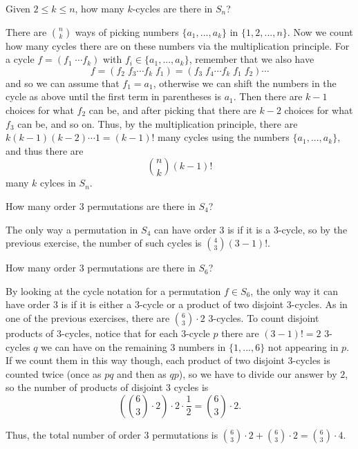 \documentclass[11pt,dvipsnames]{book}
\numberwithin{equation}{section} %
\numberwithin{figure}{section} %
\numberwithin{table}{section} %
\begin{document}
\begin{exercise}
Given $2\leq k\leq n$, how many $k$-cycles are there in $S_{n}$?

\begin{solution}
There are ${n \choose k}$ ways of picking numbers $\{a_{1},...,a_{k}\}$ in $\{1,2,...,n\}$. Now we count how many cycles there are on these numbers via the multiplication principle. For a cycle $f=(f_{1} \; \cdots  f_{k})$ with $f_{i}\in  \{a_{1},...,a_{k}\}$, remember that we also have 
\[
f=(f_{2} \; f_{3}\cdots f_{k} \; f_{1}) 
=(f_{3} \; f_{4} \cdots f_{k} \; f_{1} \; f_{2})\cdots
\]
and so we can assume that $f_{1} = a_{1}$, otherwise we can shift the numbers in the cycle as above until the first term in parentheses is $a_{1}$. Then there are $k-1$ choices for what $f_{2}$ can be, and after picking that there are $k-2$ choices for what $f_{3}$ can be, and so on. Thus, by the multiplication principle, there are $k(k-1)(k-2)\cdots 1=(k-1)!$ many cycles using the numbers  $\{a_{1},...,a_{k}\}$, and thus there are
\[
{n \choose k} (k-1)!
\]
many $k$ cylces in $S_{n}$. 
\end{solution}

\end{exercise}


\begin{exercise}
How many order $3$ permutations are there in $S_{4}$?
\begin{solution}
The only way a permutation in $S_{4}$ can have order $3$ is if it is a $3$-cycle, so by the previous exercise, the number of such cycles is ${4 \choose 3}(3-1)!$.
\end{solution}
\end{exercise}

\begin{exercise}
How many order $3$ permutations are there in $S_{6}$?


\begin{solution}
By looking at the cycle notation for a permutation $f\in S_{6}$, the only way it can have order $3$ is if it is either a $3$-cycle or a product of two disjoint $3$-cycles. As in one of the previous exercises, there are ${6\choose 3}\cdot 2$ $3$-cycles. To count disjoint products of $3$-cycles, notice that for each $3$-cycle $p$ there are $(3-1)!=2$ $3$-cycles $q$ we can have on the remaining $3$ numbers in $\{1,...,6\}$ not appearing in $p$. If we count them in this way though, each product of two disjoint $3$-cycles is counted twice (once as $pq$ and then as $qp$), so we have to divide our answer by $2$, so the number of products of disjoint $3$ cycles is 
\[
\left( {6\choose 3} \cdot 2\right) \cdot 2\cdot\frac{1}{2} = {6\choose 3} \cdot 2.
\]
\end{solution}
Thus, the total number of order $3$ permutations is ${6\choose 3} \cdot 2+ {6\choose 3} \cdot 2= {6\choose 3} \cdot 4$.
\end{exercise}
\end{document}
